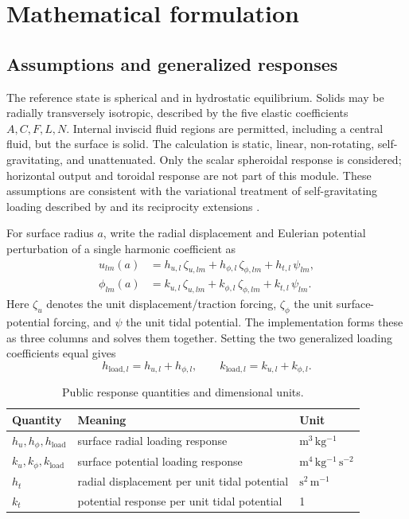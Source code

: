 \documentclass[11pt,a4paper]{article}
\begin{document}
\section{Mathematical formulation}

\subsection{Assumptions and generalized responses}

The reference state is spherical and in hydrostatic equilibrium.  Solids may
be radially transversely isotropic, described by the five elastic
coefficients \(A,C,F,L,N\).  Internal inviscid fluid regions are permitted,
including a central fluid, but the surface is solid.  The calculation is
static, linear, non-rotating, self-gravitating, and unattenuated.  Only the
scalar spheroidal response is considered; horizontal output and toroidal
response are not part of this module.  These assumptions are consistent with
the variational treatment of self-gravitating loading described by
\citet{alattar_tromp_2014} and its reciprocity extensions
\citep{alattar_et_al_2024}.

For surface radius \(a\), write the radial displacement and Eulerian
potential perturbation of a single harmonic coefficient as
\begin{align}
 u_{lm}(a) &=
 h_{u,l}\,\zeta_{u,lm}
 +h_{\phi,l}\,\zeta_{\phi,lm}
 +h_{t,l}\,\psi_{lm}, \label{eq:general-u}\\
 \phi_{lm}(a) &=
 k_{u,l}\,\zeta_{u,lm}
 +k_{\phi,l}\,\zeta_{\phi,lm}
 +k_{t,l}\,\psi_{lm}. \label{eq:general-p}
\end{align}
Here \(\zeta_u\) denotes the unit displacement/traction forcing,
\(\zeta_\phi\) the unit surface-potential forcing, and \(\psi\) the unit
tidal potential.  The implementation forms these as three columns and solves
them together.  Setting the two generalized loading coefficients equal gives
\begin{equation}
 h_{\mathrm{load},l}=h_{u,l}+h_{\phi,l},\qquad
 k_{\mathrm{load},l}=k_{u,l}+k_{\phi,l}. \label{eq:load-sums}
\end{equation}

\begin{table}[tb]
\centering
\caption{Public response quantities and dimensional units.}
\label{tab:units}
\begin{tabular}{lll}
\toprule
Quantity & Meaning & Unit\\
\midrule
\(h_u,h_\phi,h_{\mathrm{load}}\) & surface radial loading response
  & \(\mathrm{m^3\,kg^{-1}}\)\\
\(k_u,k_\phi,k_{\mathrm{load}}\) & surface potential loading response
  & \(\mathrm{m^4\,kg^{-1}\,s^{-2}}\)\\
\(h_t\) & radial displacement per unit tidal potential
  & \(\mathrm{s^2\,m^{-1}}\)\\
\(k_t\) & potential response per unit tidal potential & 1\\
\bottomrule
\end{tabular}
\end{table}
\end{document}
